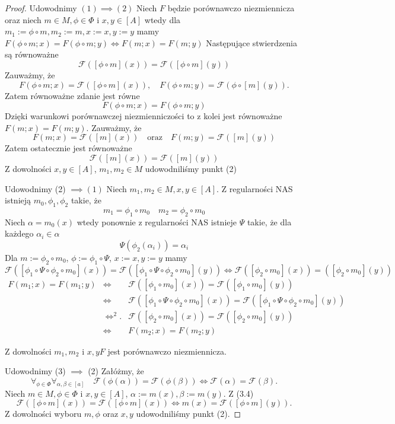 \documentclass[12pt,a4paper]{report}
\newcommand{\domkniecie}[1]{\left\lbrack{#1}\right\rbrack}
\begin{document}
\begin{proof}
Udowodnimy $(1) \implies (2)$
Niech $F$ będzie porównawczo niezmiennicza oraz niech $m\in M, \phi \in \Phi$ i $x,y\in \domkniecie{A}$ wtedy dla $m_1:=\phi\circ m, m_2:=m, x:=x, y:=y$ mamy $F(\phi\circ m;x)=F(\phi\circ m;y) \iff F(m;x)=F(m;y)$
Następujące stwierdzenia są równoważne
$$
\mathcal{F}(\domkniecie{\phi \circ m}(x))=\mathcal{F}(\domkniecie{\phi \circ m}(y))
$$
Zauważmy, że
$$
F(\phi \circ m;x)=\mathcal{F}( \domkniecie{\phi \circ m}(x)), \quad F(\phi \circ m;y)=\mathcal{F}(\phi\circ \domkniecie{m}(y)).
$$
Zatem równoważne zdanie jest równe 
$$
F(\phi\circ m;x)=F(\phi \circ m;y)
$$
Dzięki warunkowi porównawczej niezmienniczości to z kolei jest równoważne
$F(m;x)=F(m;y)$.
Zauważmy, że 
$$
F(m;x)=\mathcal{F}(\domkniecie{m}(x)) \quad \textrm{oraz} \quad F(m;y)=\mathcal{F}(\domkniecie{m}(y))
$$
Zatem ostatecznie jest równoważne 
$$
\mathcal{F}(\domkniecie{m}(x))=\mathcal{F}(\domkniecie{m}(y))
$$
Z dowolności $x, y \in \domkniecie{A}$, $m_1, m_2 \in M$ udowodniliśmy punkt (2)

Udowodnimy (2) $\implies (1)$
Niech $m_1,m_2 \in M, x, y\in \domkniecie{A}$. Z regularności NAS istnieją $m_0, \phi_1,\phi_2$ takie, że
$$ 
m_1=\phi_1\circ m_0 \quad m_2=\phi_2\circ m_0
$$
Niech $\alpha=m_0(x)$ wtedy ponownie z regularności NAS istnieje $\Psi$ takie, że dla każdego $\alpha_i \in \alpha$
$$
\Psi(\phi_2(\alpha_i))=\alpha_i
$$
Dla $m:=\phi_2 \circ m_0$, $\phi:=\phi_1\circ \Psi$, $x:=x, y:=y$ mamy $\mathcal{F}(\domkniecie{\phi_1\circ \Psi \circ \phi_2\circ m_0}(x))=\mathcal{F}(\domkniecie{\phi_1\circ \Psi \circ \phi_2\circ m_0}(y)) \iff \mathcal{F}(\domkniecie{\phi_2\circ m_0}(x))=(\domkniecie{\phi_2\circ m_0}(y))$
\begin{eqnarray*}
F(m_1;x)=F(m_1;y) & \iff  & \mathcal{F}(\domkniecie{\phi_1\circ m_0}(x))=\mathcal{F}(\domkniecie{\phi_1 \circ m_0}(y))\\
&  \iff & \mathcal{F}(\domkniecie{\phi_1\circ\Psi\circ\phi_2\circ m_0}(x))=\mathcal{F}(\domkniecie{\phi_1\circ\Psi\circ\phi_2\circ m_0}(y)) \\
& \iff^2. & \mathcal{F}(\domkniecie{\phi_2\circ m_0}(x))=\mathcal{F}(\domkniecie{\phi_2\circ m_0}(y))\\
& \iff & F(m_2;x)=F(m_2;y)
\end{eqnarray*}

Z dowolności $m_1, m_2$ i $x,y F$ jest porównawczo niezmiennicza.

Udowodnimy (3) $\implies$ (2)
Załóżmy, że
\begin{equation}
\forall_{\phi \in \Phi}\forall_{\alpha,\beta \in \domkniecie{a}} \quad \mathcal{F}(\phi(\alpha))=\mathcal{F}(\phi(\beta)) \iff \mathcal{F}(\alpha)=\mathcal{F}(\beta).
\end{equation}
Niech $m\in M, \phi\in \Phi$ i $x,y \in \domkniecie{A}$, $\alpha:= m(x), \beta:=m(y)$. Z (3.4)
$$
\mathcal{F}(\domkniecie{\phi\circ m}(x))=\mathcal{F}(\domkniecie{\phi\circ m}(x)) \iff m(x)=\mathcal{F}(\domkniecie{\phi \circ m}(y)).
$$
Z dowolności wyboru $m, \phi$ oraz $x, y$ udowodniliśmy punkt (2).
\end{proof}
\end{document}
